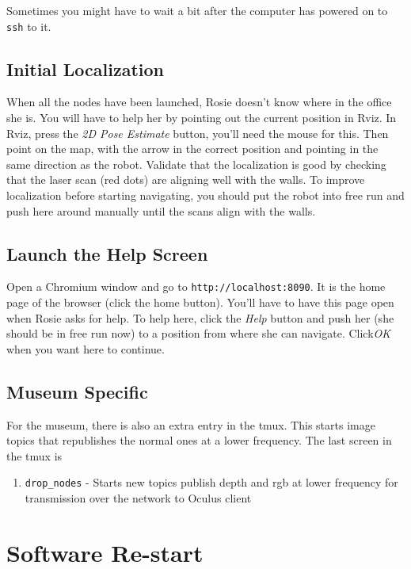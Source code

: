 \documentclass[a4paper,11pt]{article}
\begin{document}
Sometimes you might have to wait a bit after the computer has powered on
to \texttt{ssh} to it.

\subsection{Initial Localization}

When all the nodes have been launched, Rosie doesn't know where in the office
she is. You will have to help her by pointing out the current position in Rviz.
In Rviz, press the \textit{2D Pose Estimate} button, you'll need the mouse
for this. Then point on the map, with the arrow in the correct position and
pointing in the same direction as the robot. Validate that the localization is
good by checking that the laser scan (red dots) are aligning well with the walls.
To improve localization before starting navigating, you should put the robot
into free run and push here around manually until the scans align with the walls.

\subsection{Launch the Help Screen}
\label{help}

Open a Chromium window and go to \texttt{http://localhost:8090}. It is the
home page of the browser (click the home button). You'll have to have this
page open when Rosie asks for help. To help here, click the \textit{Help}
button and push her (she should be in free run now) to a position from
where she can navigate. Click\textit{OK} when you want here to continue.

\subsection{Museum Specific}

For the museum, there is also an extra entry in the tmux. This starts image
topics that republishes the normal ones at a lower frequency. The
last screen in the tmux is

\begin{enumerate}[start=8]
\item \texttt{drop\_nodes} - Starts new topics publish depth and rgb at lower frequency for transmission over the network to Oculus client
\end{enumerate}

\section{Software Re-start}
\end{document}
